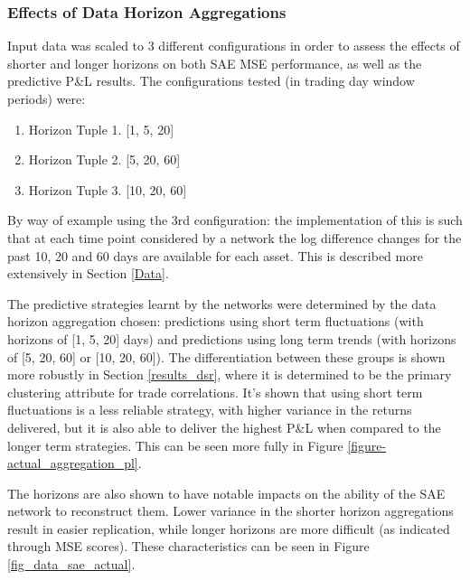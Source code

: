 \documentclass[a4paper,11pt,oneside]{article}
\theoremstyle{plain}
\theoremstyle{definition}
\begin{document}
	
	\subsubsection{Effects of Data Horizon Aggregations}
	
	Input data was scaled to 3 different configurations in order to assess the effects of shorter and longer horizons on both SAE MSE performance, as well as the predictive P\&L results. The configurations tested (in trading day window periods) were:
	
	\begin{enumerate}
		\item Horizon Tuple 1. [1, 5, 20]
		\item Horizon Tuple 2. [5, 20, 60]
		\item Horizon Tuple 3. [10, 20, 60]
	\end{enumerate}
	
	By way of example using the 3rd configuration: the implementation of this is such that at each time point considered by a network the log difference changes for the past 10, 20 and 60 days are available for each asset. This is described more extensively in Section \ref{Data}.\newline
	
	The predictive strategies learnt by the networks were determined by the data horizon aggregation chosen: predictions using short term fluctuations (with horizons of [1, 5, 20] days) and predictions using long term trends (with horizons of [5, 20, 60] or [10, 20, 60]). The differentiation between these groups is shown more robustly in Section \ref{results_dsr}, where it is determined to be the primary clustering attribute for trade correlations. It's shown that using short term fluctuations is a less reliable strategy, with higher variance in the returns delivered, but it is also able to deliver the highest P\&L when compared to the longer term strategies. This can be seen more fully in Figure \ref{figure-actual_aggregation_pl}. \newline

	The horizons are also shown to have notable impacts on the ability of the SAE network to reconstruct them. Lower variance in the shorter horizon aggregations result in easier replication, while longer horizons are more difficult (as indicated through MSE scores). These characteristics can be seen in Figure \ref{fig_data_sae_actual}.	
	
\end{document}
